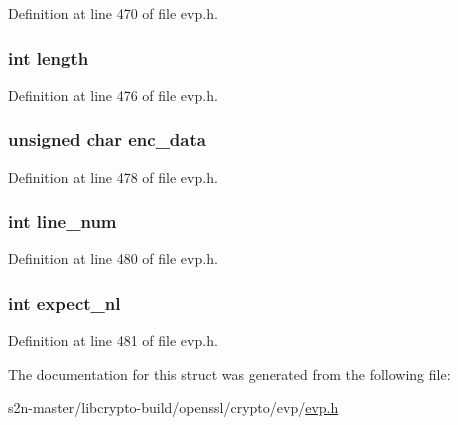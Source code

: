 Definition at line 470 of file evp.\+h.

\subsubsection[{\texorpdfstring{length}{length}}]{\setlength{\rightskip}{0pt plus 5cm}int length}\hypertarget{structevp___encode___ctx__st_a9f59b34b1f25fe00023291b678246bcc}{}\label{structevp___encode___ctx__st_a9f59b34b1f25fe00023291b678246bcc}


Definition at line 476 of file evp.\+h.

\subsubsection[{\texorpdfstring{enc\+\_\+data}{enc_data}}]{\setlength{\rightskip}{0pt plus 5cm}unsigned char enc\+\_\+data}\hypertarget{structevp___encode___ctx__st_a6d355b4e7185f1a0b47f90e4fab3f2a9}{}\label{structevp___encode___ctx__st_a6d355b4e7185f1a0b47f90e4fab3f2a9}


Definition at line 478 of file evp.\+h.

\subsubsection[{\texorpdfstring{line\+\_\+num}{line_num}}]{\setlength{\rightskip}{0pt plus 5cm}int line\+\_\+num}\hypertarget{structevp___encode___ctx__st_a7661b5d028be7f8997cef563e3890fd9}{}\label{structevp___encode___ctx__st_a7661b5d028be7f8997cef563e3890fd9}


Definition at line 480 of file evp.\+h.

\subsubsection[{\texorpdfstring{expect\+\_\+nl}{expect_nl}}]{\setlength{\rightskip}{0pt plus 5cm}int expect\+\_\+nl}\hypertarget{structevp___encode___ctx__st_aa51eb2d2ae11aaafb2820a012f1ce98b}{}\label{structevp___encode___ctx__st_aa51eb2d2ae11aaafb2820a012f1ce98b}


Definition at line 481 of file evp.\+h.



The documentation for this struct was generated from the following file\+:\begin{DoxyCompactItemize}
\item 
s2n-\/master/libcrypto-\/build/openssl/crypto/evp/\hyperlink{crypto_2evp_2evp_8h}{evp.\+h}\end{DoxyCompactItemize}
